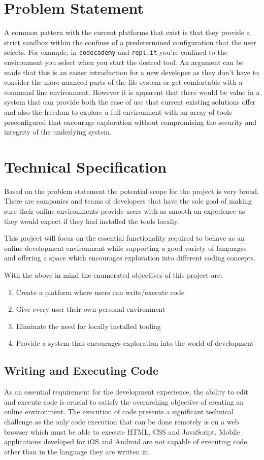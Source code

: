\section{Problem Statement} \label{section:probart-probstate}
A common pattern with the current platforms that exist is that they provide a strict sandbox within the confines of a predetermined configuration that the user selects. For example, in \texttt{codecademy} and \texttt{repl.it} you're confined to the environment you select when you start the desired tool. An argument can be made that this is an easier introduction for a new developer as they don't have to consider the more nuanced parts of the file-system or get comfortable with a command line environment. However it is apparent that there would be value in a system that can provide both the ease of use that current existing solutions offer and also the freedom to explore a full environment with an array of tools preconfigured that encourage exploration without compromising the security and integrity of the underlying system.

\section{Technical Specification} \label{section:probart-techspec}
Based on the problem statement the potential scope for the project is very broad. There are companies and teams of developers that have the sole goal of making sure their online environments provide users with as smooth an experience as they would expect if they had installed the tools locally.

This project will focus on the essential functionality required to behave as an online development environment while supporting a good variety of languages and offering a space which encourages exploration into different coding concepts.

With the above in mind the enumerated objectives of this project are: 
\begin{enumerate}
    \item Create a platform where users can write/execute code
    \item Give every user their own personal environment
    \item Eliminate the need for locally installed tooling
    \item Provide a system that encourages exploration into the world of development
\end{enumerate}

\subsection{Writing and Executing Code}
As an essential requirement for the development experience, the ability to edit and execute code is crucial to satisfy the overarching objective of creating an online environment. The execution of code presents a significant technical challenge as the only code execution that can be done remotely is on a web browser which must be able to execute HTML, CSS and JavaScript. Mobile applications developed for iOS and Android are not capable of executing code other than in the language they are written in.


